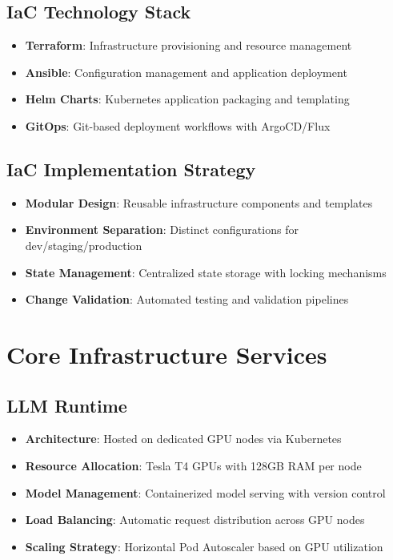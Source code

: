 \documentclass[12pt]{report}
\begin{document}
\subsection{IaC Technology Stack}
\begin{itemize}
  \item \textbf{Terraform}: Infrastructure provisioning and resource management
  \item \textbf{Ansible}: Configuration management and application deployment
  \item \textbf{Helm Charts}: Kubernetes application packaging and templating
  \item \textbf{GitOps}: Git-based deployment workflows with ArgoCD/Flux
\end{itemize}

\subsection{IaC Implementation Strategy}
\begin{itemize}
  \item \textbf{Modular Design}: Reusable infrastructure components and templates
  \item \textbf{Environment Separation}: Distinct configurations for dev/staging/production
  \item \textbf{State Management}: Centralized state storage with locking mechanisms
  \item \textbf{Change Validation}: Automated testing and validation pipelines
\end{itemize}

\section{Core Infrastructure Services}

\subsection{LLM Runtime}
\begin{itemize}
  \item \textbf{Architecture}: Hosted on dedicated GPU nodes via Kubernetes
  \item \textbf{Resource Allocation}: Tesla T4 GPUs with 128GB RAM per node
  \item \textbf{Model Management}: Containerized model serving with version control
  \item \textbf{Load Balancing}: Automatic request distribution across GPU nodes
  \item \textbf{Scaling Strategy}: Horizontal Pod Autoscaler based on GPU utilization
\end{itemize}
\end{document}
